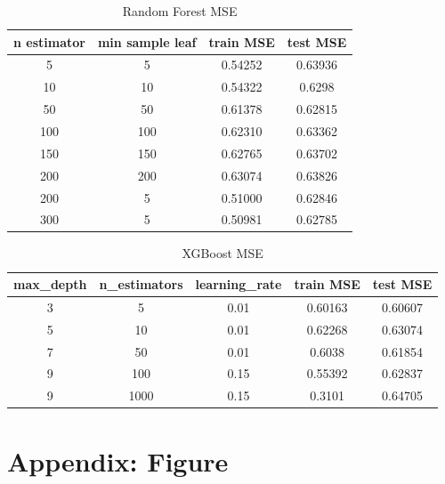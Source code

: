\documentclass[11pt, titlepage]{article}
\begin{document}
\begin{table}[H]
\centering
\label{my-label}
\begin{tabular}{|c|c|c|c|}
\hline
n estimator & min sample leaf & train MSE & test MSE \\ \hline
5           & 5               & 0.54252   & 0.63936  \\ \hline
10          & 10              & 0.54322   & 0.6298   \\ \hline
50          & 50              & 0.61378   & 0.62815  \\ \hline
100         & 100             & 0.62310   & 0.63362  \\ \hline
150         & 150             & 0.62765   & 0.63702  \\ \hline
200         & 200             & 0.63074   & 0.63826  \\ \hline
200         & 5               & 0.51000   & 0.62846  \\ \hline
300         & 5               & 0.50981   & 0.62785  \\ \hline
\end{tabular}
\caption{Random Forest MSE}
\end{table}


\begin{table}[H]
\centering
\label{my-label}
\begin{tabular}{|c|c|c|c|c|}
\hline
max\_depth & n\_estimators & learning\_rate & train MSE & test MSE \\ \hline
3          & 5             & 0.01           & 0.60163   & 0.60607  \\ \hline
5          & 10            & 0.01           & 0.62268   & 0.63074  \\ \hline
7          & 50            & 0.01           & 0.6038    & 0.61854  \\ \hline
9          & 100           & 0.15           & 0.55392   & 0.62837  \\ \hline
9          & 1000          & 0.15           & 0.3101    & 0.64705  \\ \hline
\end{tabular}
\caption{XGBoost MSE}
\end{table}

\section*{Appendix: Figure}
\end{document}
